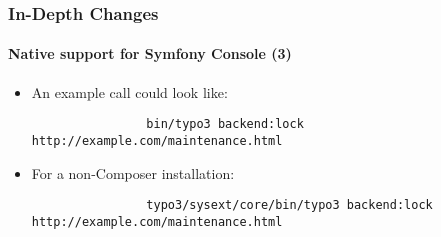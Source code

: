 \begin{frame}[fragile]
	\frametitle{In-Depth Changes}
	\framesubtitle{Native support for Symfony Console (3)}

	\lstset{basicstyle=\tiny\ttfamily}

	\begin{itemize}

		\item An example call could look like:
			\begin{lstlisting}
				bin/typo3 backend:lock http://example.com/maintenance.html
			\end{lstlisting}

		\item For a non-Composer installation:
			\begin{lstlisting}
				typo3/sysext/core/bin/typo3 backend:lock http://example.com/maintenance.html
			\end{lstlisting}

	\end{itemize}

\end{frame}

